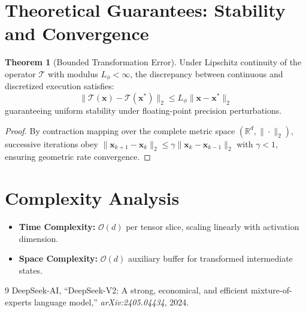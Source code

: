 \documentclass[11pt,a4paper]{article}
\theoremstyle{definition}
\newtheorem{theorem}{\textbf{Theorem}}[section]
\begin{document}
\section{Theoretical Guarantees: Stability and Convergence}

\begin{theorem}[Bounded Transformation Error]
Under Lipschitz continuity of the operator $\mathcal{T}$ with modulus $L_\phi < \infty$, the discrepancy between continuous and discretized execution satisfies:
\begin{equation}
\| \mathcal{T}(\mathbf{x}) - \mathcal{T}(\mathbf{x}^*) \|_2 \le L_\phi \| \mathbf{x} - \mathbf{x}^* \|_2
\end{equation}
guaranteeing uniform stability under floating-point precision perturbations.
\end{theorem}

\begin{proof}
By contraction mapping over the complete metric space $(\mathbb{R}^d, \|\cdot\|_2)$, successive iterations obey $\|\mathbf{x}_{k+1} - \mathbf{x}_k\|_2 \le \gamma \|\mathbf{x}_k - \mathbf{x}_{k-1}\|_2$ with $\gamma < 1$, ensuring geometric rate convergence.
\end{proof}

\section{Complexity Analysis}

\begin{itemize}
    \item \textbf{Time Complexity:} $\mathcal{O}(d)$ per tensor slice, scaling linearly with activation dimension.
    \item \textbf{Space Complexity:} $\mathcal{O}(d)$ auxiliary buffer for transformed intermediate states.
\end{itemize}

\begin{thebibliography}{9}
 DeepSeek-AI, ``DeepSeek-V2: A strong, economical, and efficient mixture-of-experts language model,'' \emph{arXiv:2405.04434}, 2024.
\end{thebibliography}
\end{document}
